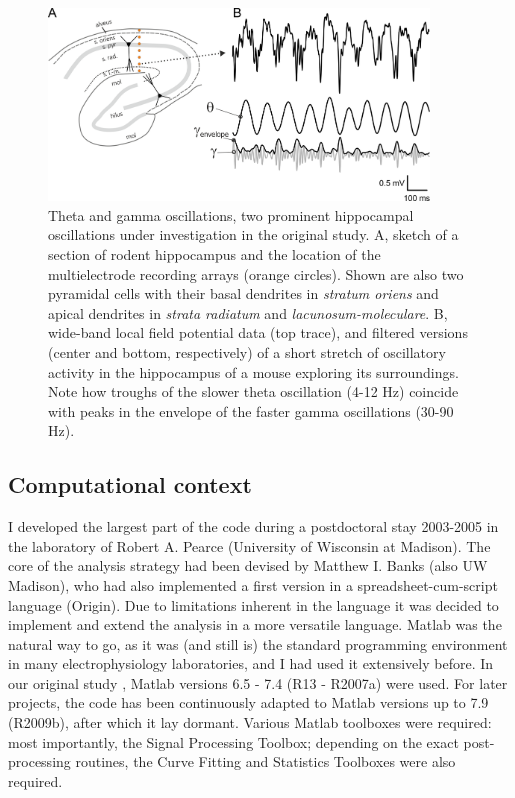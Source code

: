 \begin{figure}
	\centering
	\includegraphics[width=0.9\textwidth]{figures/figures_tenYears_01.png}
	\caption{Theta and gamma oscillations, two prominent hippocampal oscillations under investigation in the original study. A, sketch of a section of rodent hippocampus and the location of the multielectrode recording arrays (orange circles). Shown are also two pyramidal cells with their basal dendrites in \textit{stratum oriens} and apical dendrites in \textit{strata radiatum} and \textit{lacunosum-moleculare}. B, wide-band local field potential data (top trace), and filtered versions (center and bottom, respectively) of a short stretch of oscillatory activity in the hippocampus of a mouse exploring its surroundings. Note how troughs of the slower theta oscillation (4-12 Hz) coincide with peaks in the envelope of the faster gamma oscillations (30-90 Hz).}
	\label{fig:hip_oscill}
\end{figure}


\subsection{Computational context}

I developed the largest part of the code during a postdoctoral stay 2003-2005 in the laboratory of Robert A. Pearce (University of Wisconsin at Madison). The core of the analysis strategy had been devised by Matthew I. Banks (also UW Madison), who had also implemented a first version in a spreadsheet-cum-script language (Origin). Due to limitations inherent in the language it was decided to implement and extend the analysis in a more versatile language. Matlab was the natural way to go, as it was (and still is) the standard programming environment in many electrophysiology laboratories, and I had used it extensively before. In our original study \cite{hentschke_muscarinic_2007}, Matlab versions 6.5 - 7.4 (R13 - R2007a) were used. For later projects, the code has been continuously adapted to Matlab versions up to 7.9 (R2009b), after which it lay dormant. Various Matlab toolboxes were required: most importantly, the Signal Processing Toolbox; depending on the exact post-processing routines, the Curve Fitting and Statistics Toolboxes were also required. 


